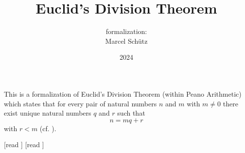 \documentclass{article}
\title{Euclid's Division Theorem}
\author{\Naproche formalization:\\[0.5em]Marcel Schütz}
\date{2024}
\begin{document}
  \maketitle

  \noindent This is a formalization of Euclid's Division Theorem
  (within Peano Arithmetic) which states
  that for every pair of natural numbers $n$ and $m$ with $m \neq 0$ there
  exist unique natural numbers $q$ and $r$ such that
  \[n = mq + r\]
  with $r < m$  (cf. \cite[p. 17]{Burton2005}).

  \begin{imports}
    \begin{forthel}
      [read ]
      [read ]
    \end{forthel}
  \end{imports}
\end{document}
